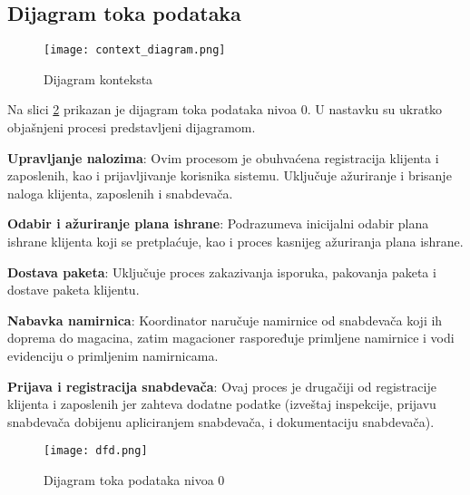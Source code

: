 \subsection{Dijagram toka podataka}

\begin{figure}[H]
	\begin{center}
		\texttt{[image: context\_diagram.png]}

	    \caption{Dijagram konteksta}
	\label{fig:context_diagram}
    \end{center}
    
\end{figure}

	Na slici \ref{fig:DFD} prikazan je dijagram toka podataka nivoa 0. U nastavku su ukratko objašnjeni procesi predstavljeni dijagramom.
	
	
	\textbf{Upravljanje nalozima}: Ovim procesom je obuhvaćena registracija klijenta i zaposlenih, kao i prijavljivanje korisnika sistemu. Uključuje ažuriranje i brisanje naloga klijenta, zaposlenih i snabdevača.
	
	\textbf{Odabir i ažuriranje plana ishrane}: Podrazumeva inicijalni odabir plana ishrane klijenta koji se pretplaćuje, kao i proces kasnijeg ažuriranja plana ishrane.
		
	\textbf{Dostava paketa}: Uključuje proces zakazivanja isporuka, pakovanja paketa i dostave paketa klijentu. 
	
	
	\textbf{Nabavka namirnica}: Koordinator naručuje namirnice od snabdevača koji ih doprema do magacina, zatim magacioner raspoređuje primljene namirnice i vodi evidenciju o primljenim namirnicama.
	
	
	\textbf{Prijava i registracija snabdevača}: Ovaj proces je drugačiji od registracije klijenta i zaposlenih jer zahteva dodatne podatke (izveštaj inspekcije, prijavu snabdevača dobijenu apliciranjem snabdevača, i dokumentaciju snabdevača).


\begin{figure}[H]
	\begin{center}
		\texttt{[image: dfd.png]}

    		\caption{Dijagram toka podataka nivoa 0}
    \label{fig:DFD}
    \end{center}
 
\end{figure}

	

